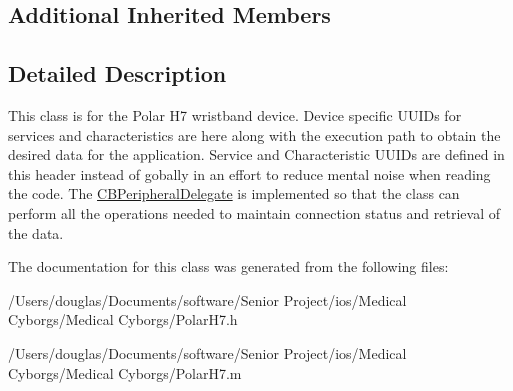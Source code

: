 \subsection*{Additional Inherited Members}


\subsection{Detailed Description}
This class is for the Polar H7 wristband device. Device specific U\-U\-I\-Ds for services and characteristics are here along with the execution path to obtain the desired data for the application. Service and Characteristic U\-U\-I\-Ds are defined in this header instead of gobally in an effort to reduce mental noise when reading the code. The \hyperlink{class_c_b_peripheral_delegate-p}{C\-B\-Peripheral\-Delegate} is implemented so that the class can perform all the operations needed to maintain connection status and retrieval of the data. 

The documentation for this class was generated from the following files\-:\begin{DoxyCompactItemize}
\item 
/\-Users/douglas/\-Documents/software/\-Senior Project/ios/\-Medical Cyborgs/\-Medical Cyborgs/Polar\-H7.\-h\item 
/\-Users/douglas/\-Documents/software/\-Senior Project/ios/\-Medical Cyborgs/\-Medical Cyborgs/Polar\-H7.\-m\end{DoxyCompactItemize}
